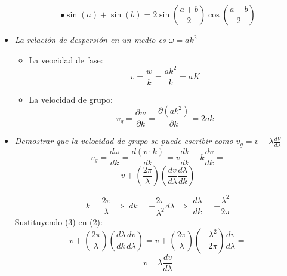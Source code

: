 \documentclass{article}
\begin{document}
\begin{itemize}
$$\bullet \sin(a)+\sin(b)=2\sin(\frac{a+b}{2}) \cos(\frac{a-b}{2})$$

\item \textit{La relación de despersión en un medio es $\omega= a k^{2}$}
\begin{itemize}
\item La veocidad de fase: $$v=\frac{w}{k}=\frac{a k^{2}}{k}=aK$$
\item La velocidad de grupo: $$ v_{g}= \frac{\partial w}{\partial k}=\frac{\partial (a k^{2})}{\partial k}=2ak$$
\end{itemize}

\item \textit{Demostrar que la velocidad de grupo se puede escribir como $v_{g}=v- \lambda \frac{dV}{d \lambda}$} 
$$ v_g=\frac{{d}\omega}{{d}k}=\frac{{d}(v\cdot k)}{{d}k}=v\frac{{d}k}{{d}k}+k\frac{{d}v}{{d}k}= $$
\begin{equation}
v + \left( \frac{2 \pi}{ \lambda} \right) \left( \frac{dv}{d \lambda} \frac{d \lambda}{d k} \right)
\end{equation} 

\begin{equation}
k=\frac{2\pi}{\lambda} \; \Rightarrow \; dk=-\frac{2 \pi}{\lambda^{2}} d \lambda \; \Rightarrow \; \frac{d \lambda}{dk}=-\frac{\lambda^{2}}{2\pi}
\end{equation}
Sustituyendo (3) en (2):
$$v + \left( \frac{2 \pi}{ \lambda} \right) \left( \frac{d \lambda}{d k} \frac{dv}{d \lambda} \right) = v+ \left( \frac{2 \pi}{ \lambda} \right) \left(  - \frac{\lambda^{2}}{2 \pi} \right)  \frac{dv}{d \lambda} = $$
$$v- \lambda \frac{dv}{d \lambda}$$
\end{itemize}
\end{document}
